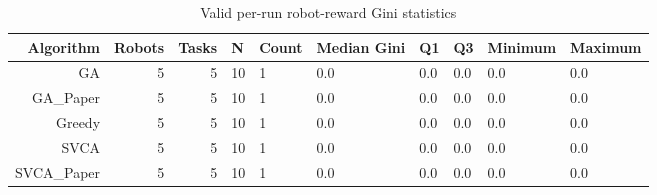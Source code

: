 \begin{table}[htbp]
\centering
\small
\caption{Valid per-run robot-reward Gini statistics}
\label{tab:research_smoke_c1_r1_20261122_gini_distribution}
\begin{tabular}{rrrlllllll}
\hline
Algorithm & Robots & Tasks & N & Count & Median Gini & Q1 & Q3 & Minimum & Maximum \\
\hline
GA & 5 & 5 & 10 & 1 & 0.0 & 0.0 & 0.0 & 0.0 & 0.0 \\
GA\_Paper & 5 & 5 & 10 & 1 & 0.0 & 0.0 & 0.0 & 0.0 & 0.0 \\
Greedy & 5 & 5 & 10 & 1 & 0.0 & 0.0 & 0.0 & 0.0 & 0.0 \\
SVCA & 5 & 5 & 10 & 1 & 0.0 & 0.0 & 0.0 & 0.0 & 0.0 \\
SVCA\_Paper & 5 & 5 & 10 & 1 & 0.0 & 0.0 & 0.0 & 0.0 & 0.0 \\
\hline
\end{tabular}
\end{table}

